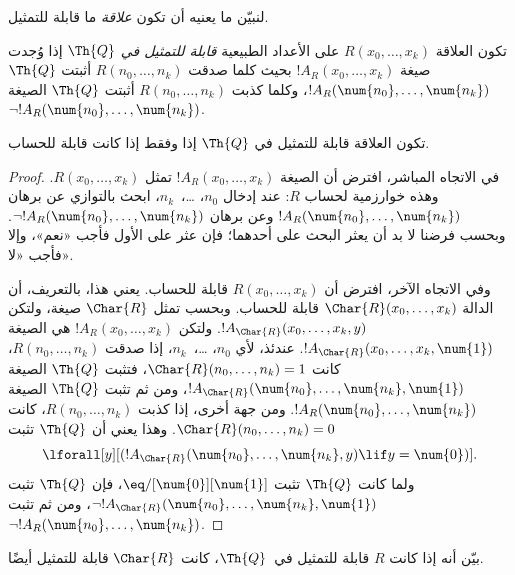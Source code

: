 \documentclass[../../../include/open-logic-section]{subfiles}
\begin{document}


لنبيّن ما يعنيه أن تكون \emph{علاقة} ما قابلة للتمثيل.

\begin{defn}
 تكون العلاقة
$R(x_0,\dots,x_k)$ على الأعداد الطبيعية {\em قابلة للتمثيل في
$\Th{Q}$} إذا وُجدت صيغة $!A_R(x_0,\dots,x_k)$ بحيث كلما صدقت
$R(n_0,\dots,n_k)$ أثبتت $\Th{Q}$
$!A_R(\num{n_0},\dots,\num{n_k})$، وكلما كذبت
$R(n_0,\dots,n_k)$ أثبتت $\Th{Q}$ الصيغة
$\lnot !A_R(\num{n_0},\dots,\num{n_k})$.
\end{defn}

\begin{thm}
 تكون العلاقة قابلة للتمثيل في
$\Th{Q}$ إذا وفقط إذا كانت قابلة للحساب.
\end{thm}

\begin{proof}
في الاتجاه المباشر، افترض أن الصيغة $!A_R(x_0,\dots,x_k)$ تمثل
$R(x_0,\dots,x_k)$. وهذه خوارزمية لحساب $R$: عند إدخال
$n_0$، \dots،~$n_k$، ابحث بالتوازي عن برهان
$!A_R(\num{n_0},\dots,\num{n_k})$ وعن برهان
$\lnot !A_R(\num{n_0},\dots,\num{n_k})$. وبحسب فرضنا لا بد أن
يعثر البحث على أحدهما؛ فإن عثر على الأول فأجب «نعم»، وإلا فأجب «لا».

وفي الاتجاه الآخر، افترض أن $R(x_0,\dots,x_k)$ قابلة للحساب. يعني
هذا، بالتعريف، أن الدالة $\Char{R}(x_0,\dots,x_k)$ قابلة للحساب.
وبحسب  تمثل $\Char{R}$ صيغة،
ولتكن $!A_{\Char{R}}(x_0,\dots,x_k,y)$. ولتكن
$!A_R(x_0,\dots,x_k)$ هي الصيغة
$!A_{\Char{R}}(x_0,\dots,x_k,\num{1})$. عندئذ، لأي
$n_0$، \dots،~$n_k$، إذا صدقت $R(n_0,\dots,n_k)$، كانت
$\Char{R}(n_0,\dots,n_k)=1$، فتثبت $\Th{Q}$ الصيغة
$!A_{\Char{R}}(\num{n_0},\dots,\num{n_k},\num{1})$، ومن ثم تثبت
$\Th{Q}$ الصيغة $!A_R(\num{n_0},\dots,\num{n_k})$. ومن جهة أخرى، إذا كذبت
$R(n_0,\dots,n_k)$، كانت $\Char{R}(n_0,\dots,n_k)=0$. وهذا يعني أن
$\Th{Q}$ تثبت
\[
\lforall[y][(!A_{\Char{R}}(\num{n_0}, \dots, \num{n_k}, y) \lif y =
  \num{0})].
\]
ولما كانت $\Th{Q}$ تثبت $\eq/[\num{0}][\num{1}]$، فإن $\Th{Q}$ تثبت
$\lnot !A_{\Char{R}}(\num{n_0},\dots,\num{n_k},\num{1})$، ومن ثم
تثبت $\lnot !A_R(\num{n_0},\dots,\num{n_k})$.
\end{proof}

\begin{prob}
بيّن أنه إذا كانت $R$ قابلة للتمثيل في~$\Th{Q}$، كانت
$\Char{R}$ قابلة للتمثيل أيضًا.
\end{prob}
\end{document}
